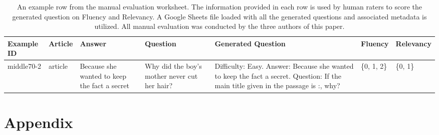 \documentclass[11pt]{article}
\begin{document}
\begin{table*}[!hbt]
\centering
\begin{tabular}{|p{1.5cm}|p{1cm}|p{3cm}|p{3cm}|p{3cm}|p{1.5cm}|p{1.5cm}|}
\hline
\textbf{Example ID} & \textbf{Article} & \textbf{Answer} & \textbf{Question} & \textbf{Generated Question} & \textbf{Fluency} & \textbf{Relevancy} \\
\hline
middle70-2 & article & Because she wanted to keep the fact a secret	& Why did the boy's mother never cut her hair? & Difficulty: Easy. Answer: Because she wanted to keep the fact a secret. Question: If the main title given in the passage is :, why?	& \{0, 1, 2\} & \{0, 1\}  \\
\hline

\end{tabular}
\caption{\label{citation-guide} 
An example row from the manual evaluation worksheet. The information provided in each row is used by human raters to score the generated question on Fluency and Relevancy. A Google Sheets file loaded with all the generated questions and associated metadata is utilized. All manual evaluation was conducted by the three authors of this paper. }

\end{table*}

\appendix
\section{Appendix}

\clearpage
\end{document}
